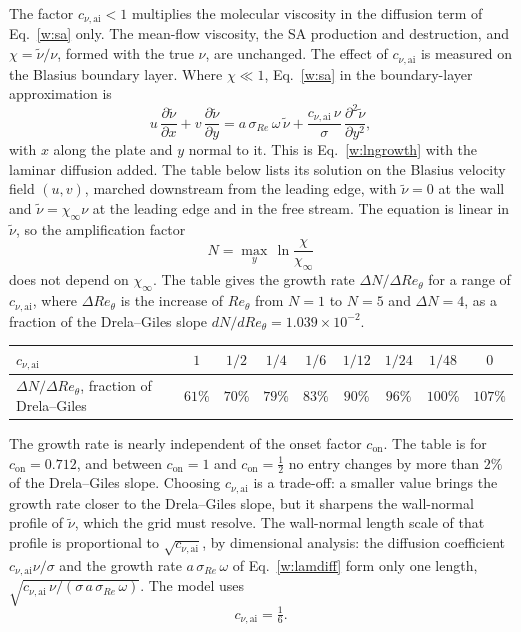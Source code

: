 \documentclass[conf]{new-aiaa}
\newcommand{\con}{c_{\mathrm{on}}}
\begin{document}
The factor $c_{\nu,\mathrm{ai}}<1$ multiplies the molecular viscosity in the
diffusion term of Eq.~\eqref{w:sa} only. The mean-flow viscosity, the SA
production and destruction, and $\chi=\tilde\nu/\nu$, formed with the true
$\nu$, are unchanged. The effect of $c_{\nu,\mathrm{ai}}$ is measured on the Blasius boundary layer.
Where $\chi\ll1$, Eq.~\eqref{w:sa} in the boundary-layer approximation is
\begin{equation}
  u\,\frac{\partial\tilde\nu}{\partial x}+v\,\frac{\partial\tilde\nu}{\partial y}
  = a\,\sigma_{Re}\,\omega\,\tilde\nu
  + \frac{c_{\nu,\mathrm{ai}}\,\nu}{\sigma}\,
    \frac{\partial^2\tilde\nu}{\partial y^2},
  \label{w:lamdiff}
\end{equation}
with $x$ along the plate and $y$ normal to it. This is
Eq.~\eqref{w:lngrowth} with the laminar diffusion added. The table below lists
its solution on the Blasius velocity field $(u,v)$, marched downstream from the
leading edge, with $\tilde\nu=0$ at the wall and $\tilde\nu=\chi_\infty\nu$ at
the leading edge and in the free stream. The equation is linear in
$\tilde\nu$, so the amplification factor
\begin{equation*}
  N=\max_y\,\ln\frac{\chi}{\chi_\infty}
\end{equation*}
does not depend on $\chi_\infty$. The table gives the growth rate
$\Delta N/\Delta Re_\theta$ for a range of $c_{\nu,\mathrm{ai}}$, where
$\Delta Re_\theta$ is the increase of $Re_\theta$ from $N=1$ to $N=5$ and
$\Delta N=4$, as a fraction of the Drela--Giles slope
$dN/dRe_\theta=1.039\times10^{-2}$.
%
\begin{center}\small
\begin{tabular}{lcccccccc}
  \toprule
  $c_{\nu,\mathrm{ai}}$ & $1$ & $1/2$ & $1/4$ & $1/6$ & $1/12$ & $1/24$ & $1/48$ & $0$ \\
  \midrule
  $\Delta N/\Delta Re_\theta$, fraction of Drela--Giles
  & $61\%$ & $70\%$ & $79\%$ & $83\%$ & $90\%$ & $96\%$ & $100\%$ & $107\%$ \\
  \bottomrule
\end{tabular}
\end{center}
%
The growth rate is nearly independent of the onset factor $\con$. The table is
for $\con=0.712$, and between $\con=1$ and $\con=\tfrac12$ no entry changes by
more than $2\%$ of the Drela--Giles slope. Choosing $c_{\nu,\mathrm{ai}}$ is a trade-off: a smaller value brings the growth rate closer to the
Drela--Giles slope, but it sharpens the wall-normal profile of $\tilde\nu$,
which the grid must resolve. The wall-normal length scale of that profile is proportional to
$\sqrt{c_{\nu,\mathrm{ai}}}$, by dimensional analysis: the diffusion
coefficient $c_{\nu,\mathrm{ai}}\nu/\sigma$ and the growth rate
$a\,\sigma_{Re}\,\omega$ of Eq.~\eqref{w:lamdiff} form only one length,
$\sqrt{c_{\nu,\mathrm{ai}}\,\nu/(\sigma\,a\,\sigma_{Re}\,\omega)}$. The model uses
\begin{equation*}
  c_{\nu,\mathrm{ai}}=\tfrac16 .
\end{equation*}
\end{document}

